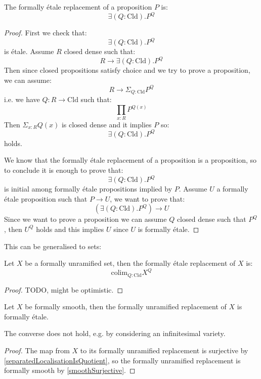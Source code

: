 \begin{lemma}
The formally étale replacement of a proposition $P$ is:
\[\exists (Q :\mathrm{Cld}). P^Q\]
\end{lemma}

\begin{proof}
First we check that:
\[\exists(Q :\mathrm{Cld}). P^Q\]
is étale. Assume $R$ closed dense such that: 
\[R\to \exists(Q :\mathrm{Cld}). P^Q\]
Then since closed propositions satisfy choice and we try to prove a proposition, we can assume:
\[R\to \Sigma_{Q :\mathrm{Cld}} P^Q\]
i.e. we have $Q : R\to \mathrm{Cld}$ such that:
\[\prod_{x:R} P^{Q(x)}\]
Then $\Sigma_{x:R}Q(x)$ is closed dense and it implies $P$ so:
\[\exists(Q :\mathrm{Cld}). P^Q\]
holds.

We know that the formally étale replacement of a proposition is a proposition, so to conclude it is enough to prove that:
\[\exists(Q :\mathrm{Cld}). P^Q\]
is initial among formally étale propositions implied by $P$. Assume $U$ a formally étale proposition such that $P\to U$, we want to prove that:
\[(\exists(Q :\mathrm{Cld}). P^Q)\to U\]
Since we want to prove a proposition we can assume $Q$ closed dense such that $P^Q$, then $U^Q$ holds and this implies $U$ since $U$ is formally étale.
\end{proof}

This can be generalised to sets:

\begin{proposition}
\label{etaleReplacementUnramified}
Let $X$ be a formally unramified set, then the formally étale replacement of $X$ is:
\[\mathrm{colim}_{Q:\mathrm{Cld}} X^Q\]
\end{proposition}

\begin{proof}
TODO, might be optimistic.
\end{proof}

\begin{proposition}
\label{unramifiedReplacementEtaleForSmooth}
Let $X$ be formally smooth, then the formally unramified replacement of $X$ is formally étale.
\end{proposition}

The converse does not hold, e.g. by considering an infinitesimal variety.

\begin{proof}
The map from $X$ to its formally unramified replacement is surjective by \cref{separatedLocalisationIsQuotient}, so the formally unramified replacement is formally smooth by \cref{smoothSurjective}.
\end{proof}

